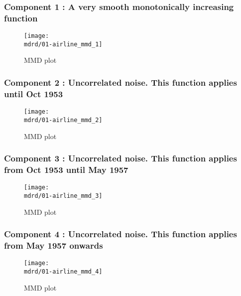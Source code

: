 \documentclass{article} %
\begin{document}
\subsubsection{Component 1 : A very smooth monotonically increasing function}

\begin{figure}[H]
\newcommand{\wmgd}{0.5\columnwidth}
\newcommand{\hmgd}{3.0cm}
\newcommand{\mdrd}{01-airline}
\newcommand{\mbm}{\hspace{-0.3cm}}
\texttt{[image: \\mdrd/01-airline\_mmd\_1]}
\caption{
MMD plot}
\label{fig:mmd1}
\end{figure}

\subsubsection{Component 2 : Uncorrelated noise. This function applies until Oct 1953}

\begin{figure}[H]
\newcommand{\wmgd}{0.5\columnwidth}
\newcommand{\hmgd}{3.0cm}
\newcommand{\mdrd}{01-airline}
\newcommand{\mbm}{\hspace{-0.3cm}}
\texttt{[image: \\mdrd/01-airline\_mmd\_2]}
\caption{
MMD plot}
\label{fig:mmd2}
\end{figure}

\subsubsection{Component 3 : Uncorrelated noise. This function applies from Oct 1953 until May 1957}

\begin{figure}[H]
\newcommand{\wmgd}{0.5\columnwidth}
\newcommand{\hmgd}{3.0cm}
\newcommand{\mdrd}{01-airline}
\newcommand{\mbm}{\hspace{-0.3cm}}
\texttt{[image: \\mdrd/01-airline\_mmd\_3]}
\caption{
MMD plot}
\label{fig:mmd3}
\end{figure}

\subsubsection{Component 4 : Uncorrelated noise. This function applies from May 1957 onwards}

\begin{figure}[H]
\newcommand{\wmgd}{0.5\columnwidth}
\newcommand{\hmgd}{3.0cm}
\newcommand{\mdrd}{01-airline}
\newcommand{\mbm}{\hspace{-0.3cm}}
\texttt{[image: \\mdrd/01-airline\_mmd\_4]}
\caption{
MMD plot}
\label{fig:mmd4}
\end{figure}
\end{document}
